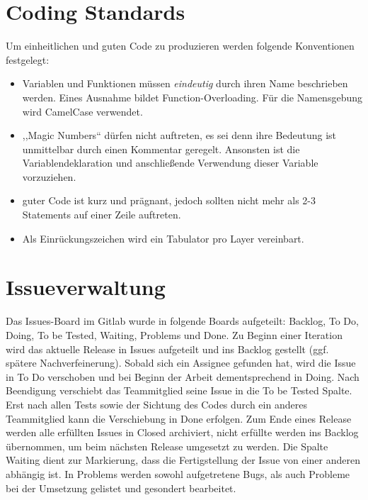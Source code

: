 \documentclass[11pt,a4paper]{scrreprt}
\begin{document}
\section{Coding Standards}
Um einheitlichen und guten Code zu produzieren werden folgende Konventionen festgelegt:
\begin{itemize}
\item Variablen und Funktionen müssen \textit{eindeutig} durch ihren Name beschrieben werden. Eines Ausnahme bildet Function-Overloading. Für die Namensgebung wird CamelCase verwendet.
\item ,,Magic Numbers`` dürfen nicht auftreten, es sei denn ihre Bedeutung ist unmittelbar durch einen Kommentar geregelt. Ansonsten ist die Variablendeklaration und anschließende Verwendung dieser Variable vorzuziehen.
\item guter Code ist kurz und prägnant, jedoch sollten nicht mehr als 2-3 Statements auf einer Zeile auftreten.
\item Als Einrückungszeichen wird ein Tabulator pro Layer vereinbart.
\end{itemize}

\section{Issueverwaltung}
Das Issues-Board im Gitlab wurde in folgende Boards aufgeteilt: Backlog, To Do, Doing, To be Tested, Waiting, Problems und Done. Zu Beginn einer Iteration wird das aktuelle Release in Issues aufgeteilt und ins Backlog gestellt (ggf. spätere Nachverfeinerung). Sobald sich ein Assignee gefunden hat, wird die Issue in To Do verschoben und bei Beginn der Arbeit dementsprechend in Doing. Nach Beendigung verschiebt das Teammitglied seine Issue in die To be Tested Spalte. Erst nach allen Tests sowie der Sichtung des Codes durch ein anderes Teammitglied kann die Verschiebung in Done erfolgen. Zum Ende eines Release werden alle erfüllten Issues in Closed archiviert, nicht erfüllte werden ins Backlog übernommen, um beim nächsten Release umgesetzt zu werden. Die Spalte Waiting dient zur Markierung, dass die Fertigstellung der Issue von einer anderen abhängig ist. In Problems werden sowohl aufgetretene Bugs, als auch Probleme bei der Umsetzung gelistet und gesondert bearbeitet.
\end{document}
